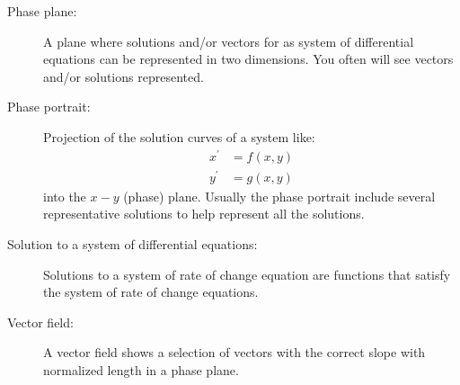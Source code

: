 \begin{description}
\item[Phase plane:] A plane where solutions and/or vectors for as system of differential equations can be represented in two dimensions. You often will see vectors and/or solutions represented.  
\item[Phase portrait:] Projection of the solution curves of a system like:
\begin{align*}
x^\prime &= f(x,y) \\
y^\prime &= g(x,y)
\end{align*}
into the $x-y$ (phase) plane. Usually the phase portrait include several representative solutions to help represent all the solutions.
\item[Solution to a system of differential equations:] Solutions to a system of rate of change equation are functions that satisfy the system of rate of change equations.
\item[Vector field:] A vector field shows a selection of vectors with the correct slope with normalized length in a phase plane.

\end{description}